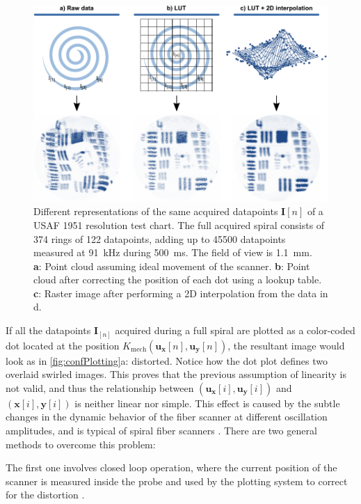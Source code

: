 \begin{figure}[h!]\centering \includegraphics{figures/50_Measurements/conf/proc/Plotting.pdf}
      \caption{Different representations of the same acquired datapoints $\mathbf{I}[n]$ of a USAF 1951 resolution test chart. The full acquired spiral consists of 374 rings of 122 datapoints, adding up to 45500 datapoints measured at \SI{91}{\kilo\hertz} during \SI{500}{\milli\second}. The field of view is \SI{1.1}{\milli\meter}.\\
      \textbf{a}: Point cloud assuming ideal movement of the scanner.
      \textbf{b}: Point cloud after correcting the position of each dot using a lookup table.
      \textbf{c}: Raster image after performing a 2D interpolation from the data in d.}
      \label{fig:confPlotting}
\end{figure}

If all the datapoints $\mathbf{I}_{[n]}$ acquired during a full spiral are plotted as a color-coded dot located at the position $K_\mathrm{mech}(\mathbf{u_x}[n], \mathbf{u_y}[n])$, the resultant image would look as in \autoref{fig:confPlotting}a: distorted. Notice how the dot plot defines two overlaid swirled images. This proves that the previous assumption of linearity is not valid, and thus the relationship between $(\mathbf{u_x}[i], \mathbf{u_y}[i])$ and $(\mathbf{x}[i], \mathbf{y}[i])$ is neither linear nor simple. This effect is caused by the subtle changes in the dynamic behavior of the fiber scanner at different oscillation amplitudes, and is typical of spiral fiber scanners \cite{Seibel2006}. There are two general methods to overcome this problem:

The first one involves closed loop operation, where the current position of the scanner is measured inside the probe and used by the plotting system to correct for the distortion \cite{Yeoh2014}. 

